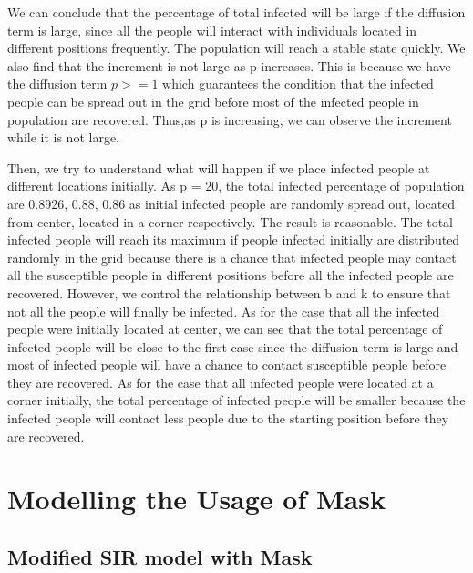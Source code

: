 \documentclass{article}
\begin{document}
 We can conclude that the percentage of total infected will be large if the diffusion term is large, since all the people will interact with individuals located in different positions frequently. The population will reach a stable state quickly. We also find that the increment is not large as p increases. This is because we have the diffusion term $p > =1$ which guarantees the condition that the infected people can be spread out in the grid before most of the infected people in population are recovered. Thus,as p is increasing, we can observe the increment while it is not large. 
 
 

Then, we try to understand what will happen if we place infected people at different locations initially. As p = 20, the total infected percentage of population are 0.8926, 0.88, 0.86 as initial infected people are randomly spread out, located from center, located in a corner respectively. The result is reasonable. The total infected people will reach its maximum if people infected initially are distributed randomly in the grid because there is a chance that infected people may contact all the susceptible people in different positions before all the infected people are recovered. However, we control the relationship between b and k to ensure that not all the people will finally be infected. As for the case that all the infected people were initially located at center, we can see that the total percentage of infected people will be close to the first case since the diffusion term is large and most of infected people will have a chance to contact susceptible people before they are recovered. As for the case that all infected people were located at a corner initially, the total percentage of infected people will be smaller because the infected people will contact less people due to the starting position before they are recovered. 



\section{Modelling the Usage of Mask}
 
\subsection{Modified SIR model with Mask}
 
\end{document}

